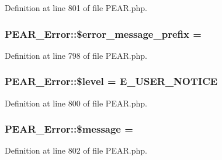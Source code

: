 Definition at line 801 of file P\+E\+A\+R.\+php.

\subsubsection[{\texorpdfstring{\$error\+\_\+message\+\_\+prefix}{$error_message_prefix}}]{\setlength{\rightskip}{0pt plus 5cm}P\+E\+A\+R\+\_\+\+Error\+::\$error\+\_\+message\+\_\+prefix = \textquotesingle{}\textquotesingle{}}\hypertarget{classPEAR__Error_aea8e8d491c90daabbc7de7ef8d9eef2d}{}\label{classPEAR__Error_aea8e8d491c90daabbc7de7ef8d9eef2d}


Definition at line 798 of file P\+E\+A\+R.\+php.

\subsubsection[{\texorpdfstring{\$level}{$level}}]{\setlength{\rightskip}{0pt plus 5cm}P\+E\+A\+R\+\_\+\+Error\+::\$level = E\+\_\+\+U\+S\+E\+R\+\_\+\+N\+O\+T\+I\+CE}\hypertarget{classPEAR__Error_a3fad062a32df55f9bd17af007e16cd49}{}\label{classPEAR__Error_a3fad062a32df55f9bd17af007e16cd49}


Definition at line 800 of file P\+E\+A\+R.\+php.

\subsubsection[{\texorpdfstring{\$message}{$message}}]{\setlength{\rightskip}{0pt plus 5cm}P\+E\+A\+R\+\_\+\+Error\+::\$message = \textquotesingle{}\textquotesingle{}}\hypertarget{classPEAR__Error_a21cd38ff638a63b3d6506d994bc488df}{}\label{classPEAR__Error_a21cd38ff638a63b3d6506d994bc488df}


Definition at line 802 of file P\+E\+A\+R.\+php.

